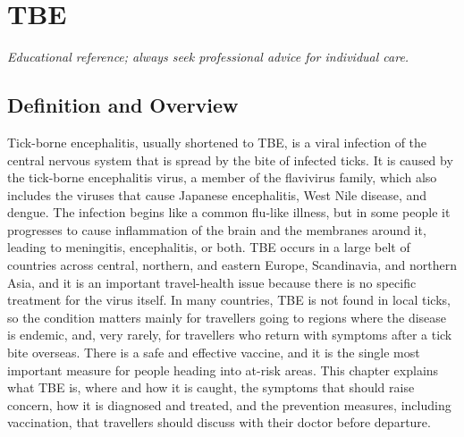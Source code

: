 \chapter{TBE}

\medskip
\noindent\textit{Educational reference; always seek professional advice for individual care.}

\section*{Definition and Overview}
Tick-borne encephalitis, usually shortened to TBE, is a viral infection of the central nervous system that is spread by the bite of infected ticks. It is caused by the tick-borne encephalitis virus, a member of the flavivirus family, which also includes the viruses that cause Japanese encephalitis, West Nile disease, and dengue. The infection begins like a common flu-like illness, but in some people it progresses to cause inflammation of the brain and the membranes around it, leading to meningitis, encephalitis, or both. TBE occurs in a large belt of countries across central, northern, and eastern Europe, Scandinavia, and northern Asia, and it is an important travel-health issue because there is no specific treatment for the virus itself. In many countries, TBE is not found in local ticks, so the condition matters mainly for travellers going to regions where the disease is endemic, and, very rarely, for travellers who return with symptoms after a tick bite overseas. There is a safe and effective vaccine, and it is the single most important measure for people heading into at-risk areas. This chapter explains what TBE is, where and how it is caught, the symptoms that should raise concern, how it is diagnosed and treated, and the prevention measures, including vaccination, that travellers should discuss with their doctor before departure.

